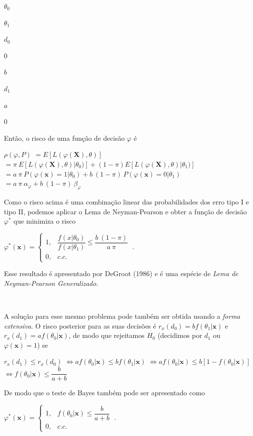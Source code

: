 \documentclass[
]{book}
\begin{document}
\(\theta_0\)

\(\theta_1\)

\(d_0\)

\(0\)

\(b\)

\(d_1\)

\(a\)

\(0\)

Então, o risco de uma função de decisão \(\varphi\) é

\(\rho(\varphi,P)\) \(=E\left[L(\varphi(\boldsymbol X),\theta)\right]\)
\(= \pi~E\left[L(\varphi(\boldsymbol X),\theta)\big|\theta_0)\right] + (1-\pi)E\left[L(\varphi(\boldsymbol X),\theta)\big|\theta_1)\right]\)
\(= a~\pi~P\left(\varphi(\boldsymbol x)=1\big|\theta_0\right) + b~(1-\pi)~P\left(\varphi(\boldsymbol x)=0\big|\theta_1\right)\)
\(= a~\pi~\alpha_\varphi + b~(1-\pi)~\beta_\varphi\)

Como o risco acima é uma combinação linear das probabilidades dos erro tipo I e tipo II, podemos aplicar o Lema de Neyman-Pearson e obter a função de decisão \(\varphi^*\) que minimiza o risco

\({\varphi}^*(\boldsymbol x)=\left\{\begin{array}{rl} 1,& \dfrac{f(x|\theta_0)}{f(x|\theta_1)}\leq \dfrac{b~(1-\pi)}{a~\pi}\\ 0,& c.c.\end{array}\right.~.\)

Esse resultado é apresentado por DeGroot (1986) e é uma espécie de \emph{Lema de Neyman-Pearson Generalizado}.

\(~\)

A solução para esse mesmo problema pode também ser obtida usando a \emph{forma extensiva}. O risco posterior para as suas decisões é \(r_x(d_0) = b f(\theta_1|\boldsymbol x)\) e \(r_x(d_1) = a f(\theta_0|\boldsymbol x)\), de modo que rejeitamos \(H_0\) (decidimos por \(d_1\) ou \(\varphi(\boldsymbol x)=1\)) se

\(r_x(d_1) \leq r_x(d_0)\)
\(\Longleftrightarrow a f(\theta_0|\boldsymbol x) \leq b f(\theta_1|\boldsymbol x)\)
\(\Longleftrightarrow a f(\theta_0|\boldsymbol x) \leq b \left[1-f(\theta_0|\boldsymbol x)\right]\)
\(\Longleftrightarrow f(\theta_0|\boldsymbol x) \leq \dfrac{b}{a+b}\)

De modo que o teste de Bayes também pode ser apresentado como

\({\varphi}^*(\boldsymbol x)=\left\{\begin{array}{rl} 1,& f(\theta_0|\boldsymbol x) \leq \dfrac{b}{a+b} \\ 0,& c.c.\end{array}\right.~.\)
\end{document}
